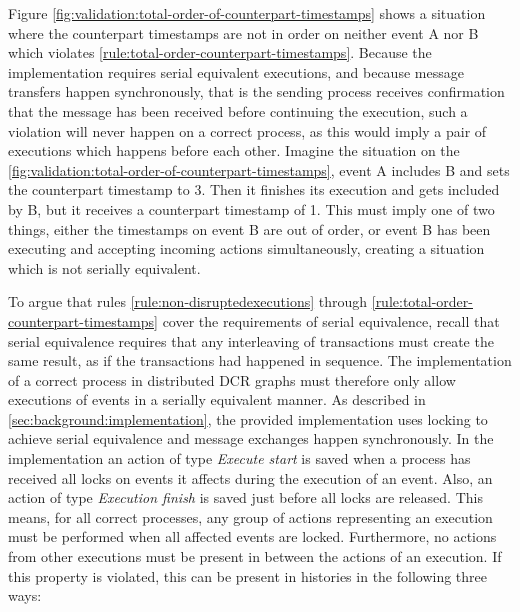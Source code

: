 	\newpar Figure \ref{fig:validation:total-order-of-counterpart-timestamps} shows a situation where the counterpart timestamps are not in order on neither event A nor B which violates \autoref{rule:total-order-counterpart-timestamps}. Because the implementation requires serial equivalent executions, and because message transfers happen synchronously, that is the sending process receives confirmation that the message has been received before continuing the execution, such a violation will never happen on a correct process, as this would imply a pair of executions which happens before each other. Imagine the situation on the \autoref{fig:validation:total-order-of-counterpart-timestamps}, event A includes B and sets the counterpart timestamp to 3. Then it finishes its execution and gets included by B, but it receives a counterpart timestamp of 1. This must imply one of two things, either the timestamps on event B are out of order, or event B has been executing and accepting incoming actions simultaneously, creating a situation which is not serially equivalent. 
	
	\newpar To argue that rules \ref{rule:non-disruptedexecutions} through \ref{rule:total-order-counterpart-timestamps} cover the requirements of serial equivalence, recall that serial equivalence requires that any interleaving of transactions must create the same result, as if the transactions had happened in sequence. The implementation of a correct process in distributed DCR graphs must therefore only allow executions of events in a serially equivalent manner. As described in \autoref{sec:background:implementation}, the provided implementation uses locking to achieve serial equivalence and message exchanges happen synchronously. In the implementation an action of type \textit{Execute start} is saved when a process has received all locks on events it affects during the execution of an event. Also, an action of type \textit{Execution finish} is saved just before all locks are released. This means, for all correct processes, any group of actions representing an execution must be performed when all affected events are locked. Furthermore, no actions from other executions must be present in between the actions of an execution. If this property is violated, this can be present in histories in the following three ways:
	
